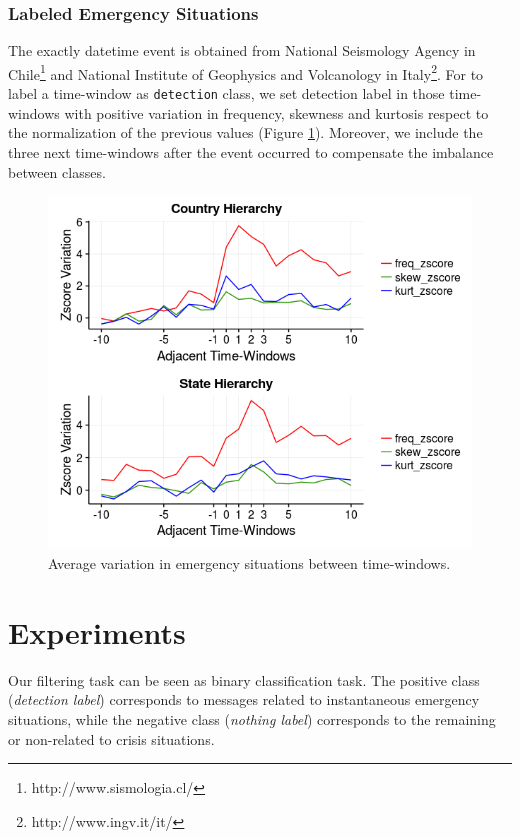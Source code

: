 \documentclass[sigconf]{acmart}
\begin{document}
\subsubsection{Labeled Emergency Situations}

The exactly datetime event is obtained from National Seismology Agency in Chile\footnote{http://www.sismologia.cl/} and 
National Institute of Geophysics and Volcanology in Italy\footnote{http://www.ingv.it/it/}. For to label a time-window as \texttt{detection} class, we set detection label in those time-windows with positive variation in frequency, skewness and kurtosis respect to the normalization of the previous values (Figure \ref{fig:labeled}). Moreover, we include the three next time-windows after the event occurred to compensate the imbalance between classes.

\begin{figure}
	\centering
	\includegraphics[width=\columnwidth]{img/labeled2.png}
	\caption{Average variation in emergency situations between time-windows.}
	\label{fig:labeled}
\end{figure}



\section{Experiments}

Our filtering task can be seen as binary classification task. The positive class (\textit{detection label}) corresponds to messages related to instantaneous emergency situations, while the negative class (\textit{nothing label}) corresponds to the remaining or non-related to crisis situations.
\end{document}
